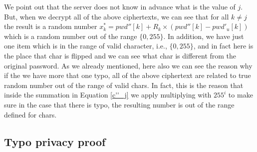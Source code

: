 We point out that the server does not know in advance what is the value of $ j $. But, when we decrypt all of the above ciphertexts, we can see that for all $ k \neq j $ the result is a random number $ x^*_k  =pwd''[k] + R_k\times (pwd''[k] - pwd'_u[k]) $ which is a random number out of the range $ \{0, 255\} $. In addition, we have just one item which is in the range of valid character, i.e., $ \{0,255\} $, and in fact here is the place that char is flipped and we can see what char is different from the original password. As we already mentioned, here also we can see the reason why if the we have more that one typo, all of the above ciphertext are related to true random number out of the range of valid chars. In fact, this is the reason that inside the summation in Equation \eqref{c''_j} we apply multiplying with $ 255^i $ to make sure in the case that there is typo, the resulting number is out of the range defined for chars. 




\subsection{Typo privacy proof}

